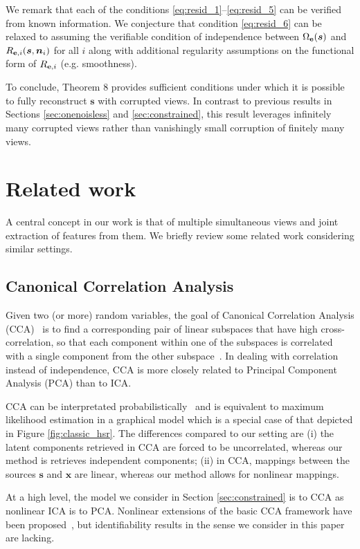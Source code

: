 We remark that each of the conditions \ref{eq:resid_1}--\ref{eq:resid_5} can be verified from known information.
We conjecture that condition \ref{eq:resid_6} can be relaxed to assuming the verifiable condition of independence between $\Omega_{\mathbf{e}}(\bm{s})$ and $R_{\mathbf{e}, i}(\bm{s}, \bm{n}_i)$ for all $i$ along with additional regularity assumptions on the functional form of $R_{\mathbf{e}, i}$ (e.g. smoothness).

To conclude, Theorem 8 provides sufficient conditions under which it is possible to fully reconstruct $\bm{s}$ with corrupted views.
In contrast to previous results in Sections \ref{sec:onenoisless} and \ref{sec:constrained}, this result leverages infinitely many corrupted views rather than vanishingly small corruption of finitely many views.




\section{Related work}
\label{sec:related-work}
A central concept in our work is that of multiple simultaneous views and joint extraction of features from them. We briefly review some related work considering similar settings.
\subsection{Canonical Correlation Analysis}
\label{sec:probacca}
Given two (or more) random variables, the goal of Canonical Correlation Analysis (CCA)~\cite{hotelling1992relations} is to find a corresponding pair of linear subspaces that have high cross-correlation, so that each component within one of the subspaces is correlated with a single component from the other subspace~\cite{bishop2006pattern}.
In dealing with correlation instead of independence, CCA is more closely related to Principal Component Analysis (PCA) than to ICA.

CCA can be interpretated probabilistically~\cite{bach2005probabilistic} and is equivalent to maximum likelihood estimation in a graphical model which is a special case of that depicted in Figure \ref{fig:classic_hsr}.
The differences compared to our setting are (i) the latent components retrieved in CCA are forced to be uncorrelated, whereas our method is retrieves independent components; (ii) in CCA, mappings between the sources $\bm{s}$ and $\bm{x}$ are linear, whereas our method allows for nonlinear mappings.

At a high level, the model we consider in Section \ref{sec:constrained} is to CCA as nonlinear ICA is to PCA.
Nonlinear extensions of the basic CCA framework have been proposed~\cite{lai2000kernel, fukumizu2007statistical, andrew2013deep, michaeli2016nonparametric}, but identifiability results in the sense we consider in this paper are lacking.



